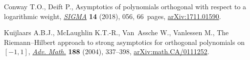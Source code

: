 Conway T.O., Deift P., Asymptotics of polynomials orthogonal with respect to a
 logarithmic weight, \href{https://doi.org/10.3842/SIGMA.2018.056}{\textit{SIGMA}} \textbf{14} (2018), 056, 66~pages,
 \href{https://arxiv.org/abs/1711.01590}{arXiv:1711.01590}.


Kuijlaars A.B.J., McLaughlin K.T.-R., Van~Assche W., Vanlessen M., The
 {R}iemann--{H}ilbert approach to strong asymptotics for orthogonal
 polynomials on {$[-1,1]$}, \href{https://doi.org/10.1016/j.aim.2003.08.015}{\textit{Adv. Math.}} \textbf{188} (2004), 337--398,
 \href{https://arxiv.org/abs/math.CA/0111252}{arXiv:math.CA/0111252}.
